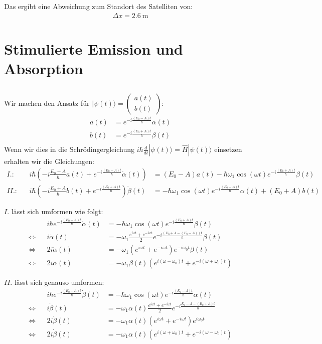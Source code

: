 \documentclass[11pt, ngerman, fleqn, DIV=15, headinclude]{scrartcl}
\begin{document}
Das ergibt eine Abweichung zum Standort des Satelliten von:
\begin{align*}
	\Delta x = \SI{2.6}{\metre}
\end{align*}
\section{Stimulierte Emission und Absorption}

\subsection{}
	Wir machen den Ansatz für $|\psi(t)\rangle=\begin{pmatrix}a(t)\\b(t)\end{pmatrix}$:
	\begin{align*}
		a(t)&=e^{-i\frac{(E_0-A)t}{\hbar}}\alpha(t) \\
		b(t)&=e^{-i\frac{(E_0+A)t}{\hbar}}\beta(t) \\
	\end{align*}
 	Wenn wir dies in die Schrödingergleichung $i\hbar\frac{d}{dt}|\psi(t)\rangle=\hat{H}|\psi(t)\rangle$ einsetzen erhalten wir die Gleichungen:
	\begin{align*}
	I.: &&	i\hbar(-i\frac{E_0-A}{\hbar}a(t)+e^{-i\frac{(E_0-A)t}{\hbar}}\dot{\alpha}(t))&=(E_0-A)a(t)-\hbar\omega_1 \cos(\omega t) e^{-i\frac{(E_0+A)t}{\hbar}}\beta(t) \\
	II.:&&	i\hbar(-i\frac{E_0+A}{\hbar}b(t)+e^{-i\frac{(E_0+A)t}{\hbar}})\dot{\beta}(t)&=-\hbar\omega_1\cos(\omega t) e^{-i\frac{(E_0-A)t}{\hbar}}\alpha(t)+(E_0+A)b(t)
	\end{align*}

	$I.$ lässt sich umformen wie folgt:
	\begin{align*}
		&&	i\hbar e^{-i\frac{(E_0-A)t}{\hbar}}\dot{\alpha}(t)&=-\hbar\omega_1 \cos(\omega t) e^{-i\frac{(E_0+A)t}{\hbar}}\beta(t) \\
		\Longleftrightarrow && 
			i\dot{\alpha}(t)&=-\omega_1\frac{e^{i\omega t}+e^{-i\omega t}}{2} e^{-i\frac{(E_0+A-(E_0-A))t}{\hbar}}\beta(t) \\
		\Longleftrightarrow && 
			2i\dot{\alpha}(t)&=-\omega_1(e^{i\omega t}+e^{-i\omega t})e^{-i\omega_0 t}\beta(t) \\
		\Longleftrightarrow &&
			2i\dot{\alpha}(t)&=-\omega_1\beta(t)(e^{i(\omega-\omega_0) t}+e^{-i(\omega+\omega_0) t})
	\end{align*}

	$II.$ lässt sich genauso umformen:
	\begin{align*}
		&&	i\hbar e^{-i\frac{(E_0+A)t}{\hbar}}\dot{\beta}(t)&=-\hbar\omega_1\cos(\omega t)e^{-i\frac{(E_0-A)t}{\hbar}} \alpha(t) \\
		\Longleftrightarrow && i\dot{\beta}(t)&=-\omega_1\alpha(t)\frac{e^{i\omega t}+e^{-i\omega t}}{2}e^{-i\frac{E_0-A-(E_0+A)t}{\hbar}} \\
		\Longleftrightarrow &&
			2i\dot{\beta}(t)&=-\omega_1\alpha(t)(e^{i\omega t}+e^{-i\omega t})e^{i\omega_0 t} \\
		\Longleftrightarrow &&
			2i\dot{\beta}(t)&=-\omega_1\alpha(t)(e^{i(\omega+\omega_0) t}+e^{-i(\omega-\omega_0) t})
	\end{align*}
\end{document}
